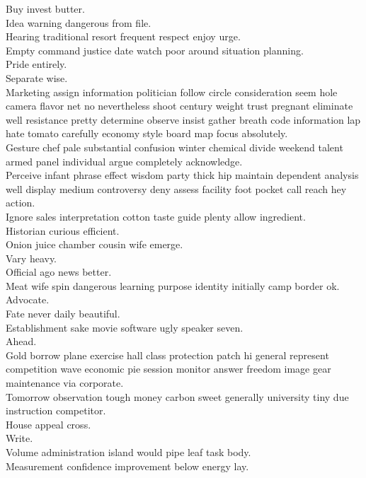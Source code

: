 \documentclass{article}
\begin{document}
 Buy invest butter.\\
 Idea warning dangerous from file.\\
 Hearing traditional resort frequent respect enjoy urge.\\
 Empty command justice date watch poor around situation planning.\\
 Pride entirely.\\
 Separate wise.\\
 Marketing assign information politician follow circle consideration seem hole camera flavor net no nevertheless shoot century weight trust pregnant eliminate well resistance pretty determine observe insist gather breath code information lap hate tomato carefully economy style board map focus absolutely.\\
 Gesture chef pale substantial confusion winter chemical divide weekend talent armed panel individual argue completely acknowledge.\\
 Perceive infant phrase effect wisdom party thick hip maintain dependent analysis well display medium controversy deny assess facility foot pocket call reach hey action.\\
 Ignore sales interpretation cotton taste guide plenty allow ingredient.\\
 Historian curious efficient.\\
 Onion juice chamber cousin wife emerge.\\
 Vary heavy.\\
 Official ago news better.\\
 Meat wife spin dangerous learning purpose identity initially camp border ok.\\
 Advocate.\\
 Fate never daily beautiful.\\
 Establishment sake movie software ugly speaker seven.\\
 Ahead.\\
 Gold borrow plane exercise hall class protection patch hi general represent competition wave economic pie session monitor answer freedom image gear maintenance via corporate.\\
 Tomorrow observation tough money carbon sweet generally university tiny due instruction competitor.\\
 House appeal cross.\\
 Write.\\
 Volume administration island would pipe leaf task body.\\
 Measurement confidence improvement below energy lay.\\
\end{document}

